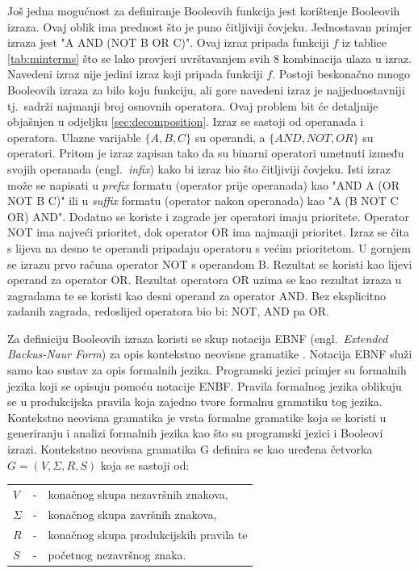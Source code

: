 \documentclass[times, utf8, diplomski]{fer}
\begin{document}
Još jedna mogućnost za definiranje Booleovih funkcija jest korištenje Booleovih izraza. Ovaj oblik ima prednost što je puno čitljiviji čovjeku. Jednostavan primjer izraza jest "A AND (NOT B OR C)". Ovaj izraz pripada funkciji $f$ iz tablice \ref{tab:minterms} što se lako provjeri uvrštavanjem svih $8$ kombinacija ulaza u izraz. Navedeni izraz nije jedini izraz koji pripada funkciji $f$. Postoji beskonačno mnogo Booleovih izraza za bilo koju funkciju, ali gore navedeni izraz je najjednostavniji tj.~sadrži najmanji broj osnovnih operatora. Ovaj problem bit će detaljnije objašnjen u odjeljku \ref{sec:decomposition}. Izraz se sastoji od operanada i operatora. Ulazne varijable $\{A, B, C\}$ su operandi, a $\{AND, NOT, OR\}$ su operatori. Pritom je izraz zapisan tako da su binarni operatori umetnuti između svojih operanada (engl.~\textit{infix}) kako bi izraz bio što čitljiviji čovjeku. Isti izraz može se napisati u \textit{prefix} formatu (operator prije operanada) kao "AND A (OR NOT B C)" ili u \textit{suffix} formatu (operator nakon operanada) kao "A (B NOT C OR) AND". Dodatno se koriste i zagrade jer operatori imaju prioritete. Operator NOT ima najveći prioritet, dok operator OR ima najmanji prioritet. Izraz se čita s lijeva na desno te operandi pripadaju operatoru s većim prioritetom. U gornjem se izrazu prvo računa operator NOT s operandom B. Rezultat se koristi kao lijevi operand za operator OR. Rezultat operatora OR uzima se kao rezultat izraza u zagradama te se koristi kao desni operand za operator AND. Bez eksplicitno zadanih zagrada, redoslijed operatora bio bi: NOT, AND pa OR.

Za definiciju Booleovih izraza koristi se skup notacija EBNF (engl.~\textit{Extended Backus-Naur Form}) za opis kontekstno neovisne gramatike \cite{book:jezproc}. Notacija EBNF služi samo kao sustav za opis formalnih jezika. Programski jezici primjer su formalnih jezika koji se opisuju pomoću notacije ENBF. Pravila formalnog jezika oblikuju se u produkcijska pravila koja zajedno tvore formalnu gramatiku tog jezika. Kontekstno neovisna gramatika je vrsta formalne gramatike koja se koristi u generiranju i analizi formalnih jezika kao što su programski jezici i Booleovi izrazi. Kontekstno neovisna gramatika G definira se kao uređena četvorka $G=(V, \Sigma, R, S)$ koja se sastoji od:
%
\begin{center}
	\begin{tabular}{lcl}
		$V$ & - & konačnog skupa nezavršnih znakova, \\
		$\Sigma$ & - & konačnog skupa završnih znakova, \\
		$R$ & - & konačnog skupa produkcijskih pravila te \\
		$S$ & - & početnog nezavršnog znaka.
	\end{tabular}
\end{center}
\end{document}
